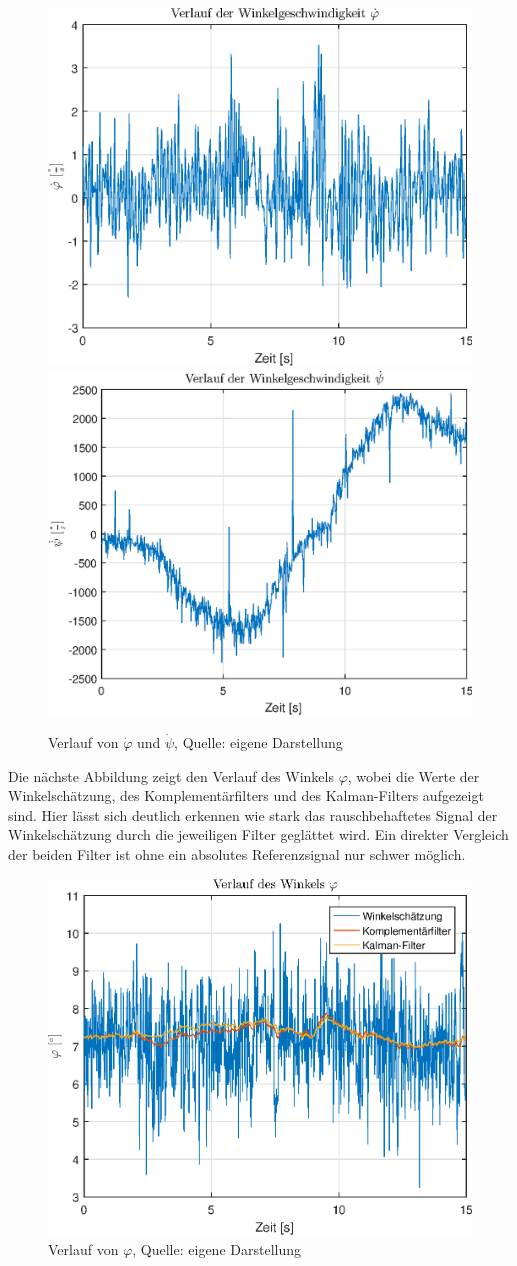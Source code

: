 \begin{figure}[h]
\centering
\includegraphics[scale=0.5]{img/phi__d_regelung}
\includegraphics[scale=0.5]{img/psi__d_regelung}
\caption{Verlauf von $\dot{\varphi}$ und $\dot{\psi}$, Quelle: eigene Darstellung}
\end{figure}

\newpage
Die nächste Abbildung zeigt den Verlauf des Winkels $\varphi$, wobei die Werte der Winkelschätzung, des Komplementärfilters und des Kalman-Filters aufgezeigt sind. Hier lässt sich deutlich erkennen wie stark das rauschbehaftetes Signal der Winkelschätzung durch die jeweiligen Filter geglättet wird. Ein direkter Vergleich der beiden Filter ist ohne ein absolutes Referenzsignal nur schwer möglich.

\begin{figure}[h!]
\centering
\includegraphics[width=0.5\linewidth]{img/phi_regelung}
\caption{Verlauf von $\varphi$, Quelle: eigene Darstellung}
\end{figure}

